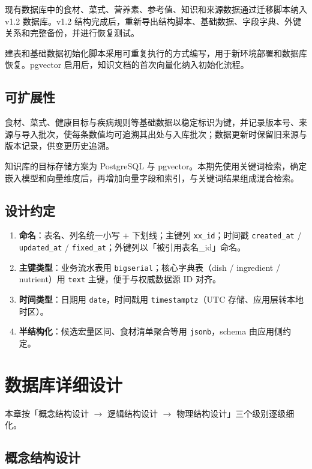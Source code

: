 \documentclass[12pt,a4paper]{ctexart}
\begin{document}
现有数据库中的食材、菜式、营养素、参考值、知识和来源数据通过迁移脚本纳入 v1.2 数据库。v1.2 结构完成后，重新导出结构脚本、基础数据、字段字典、外键关系和完整备份，并进行恢复测试。

建表和基础数据初始化脚本采用可重复执行的方式编写，用于新环境部署和数据库恢复。pgvector 启用后，知识文档的首次向量化纳入初始化流程。

\subsection{可扩展性}

食材、菜式、健康目标与疾病规则等基础数据以稳定标识为键，并记录版本号、来源与导入批次，使每条数值均可追溯其出处与入库批次；数据更新时保留旧来源与版本记录，供变更历史追溯。

知识库的目标存储方案为 PostgreSQL 与 pgvector。本期先使用关键词检索，确定嵌入模型和向量维度后，再增加向量字段和索引，与关键词结果组成混合检索。

\subsection{设计约定}

\begin{enumerate}
\item \textbf{命名}：表名、列名统一小写 + 下划线；主键列 \texttt{xx\_id}；时间戳 \texttt{created\_at} / \texttt{updated\_at} / \texttt{fixed\_at}；外键列以「被引用表名\_id」命名。
\item \textbf{主键类型}：业务流水表用 \texttt{bigserial}；核心字典表（dish / ingredient / nutrient）用 \texttt{text} 主键，便于与权威数据源 ID 对齐。
\item \textbf{时间类型}：日期用 \texttt{date}，时间戳用 \texttt{timestamptz}（UTC 存储、应用层转本地时区）。
\item \textbf{半结构化}：候选宏量区间、食材清单聚合等用 \texttt{jsonb}，schema 由应用侧约定。
\end{enumerate}

\section{数据库详细设计}

本章按「概念结构设计 $\rightarrow$ 逻辑结构设计 $\rightarrow$ 物理结构设计」三个级别逐级细化。

\subsection{概念结构设计}
\end{document}
